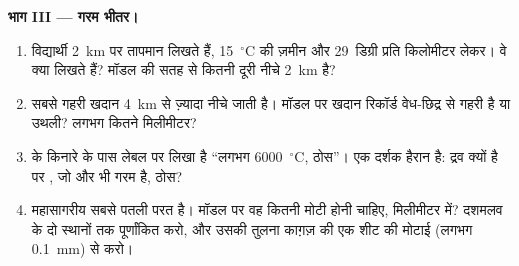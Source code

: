 \begin{problem}
\medskip
\noindent\textbf{भाग III --- गरम भीतर।}
\begin{enumerate}[resume]
  \item विद्यार्थी 2~km पर तापमान लिखते हैं, 15~$^\circ$C की ज़मीन और
        29~डिग्री प्रति किलोमीटर लेकर। वे क्या लिखते हैं? मॉडल की
        सतह से कितनी दूरी नीचे 2~km है?
  \item सबसे गहरी खदान 4~km से ज़्यादा नीचे जाती है। मॉडल पर खदान रिकॉर्ड
        वेध-छिद्र से गहरी है या उथली? लगभग कितने
        मिलीमीटर?
  \item {} के किनारे के पास लेबल पर लिखा है ``लगभग
        6000~$^\circ$C, ठोस''। एक दर्शक हैरान है: 
        द्रव क्यों है पर , जो और भी गरम है, ठोस?
  \item महासागरीय  सबसे पतली परत है। मॉडल पर वह कितनी मोटी होनी चाहिए,
        मिलीमीटर में? दशमलव के दो स्थानों तक पूर्णांकित करो, और उसकी तुलना
        काग़ज़ की एक शीट की मोटाई (लगभग 0.1~mm) से करो।
\end{enumerate}
\end{problem}
